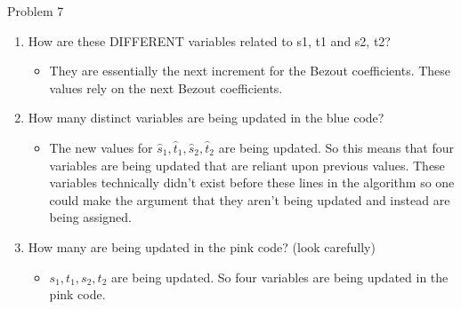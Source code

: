 \begin{problem}{Problem 7}
\begin{highlight}[Solution]
        \begin{enumerate}[start = 7]
            \item How are these DIFFERENT variables related to s1, t1 and s2, t2?
            \begin{itemize}
                \item They are essentially the next increment for the Bezout coefficients. These values rely on the next Bezout coefficients.
            \end{itemize}
            \item How many distinct variables are being updated in the blue code?
            \begin{itemize}
                \item The new values for $\hat{s}_{1},\hat{t}_{1},\hat{s}_{2},\hat{t}_{2}$ are being updated. So this means that four variables are being updated that are reliant upon previous values.
                These variables technically didn't exist before these lines in the algorithm so one could make the argument that they aren't being updated and instead are being assigned.
            \end{itemize}
            \item How many are being updated in the pink code? (look carefully)
            \begin{itemize}
                \item $s_{1},t_{1},s_{2},t_{2}$ are being updated. So four variables are being updated in the pink code.
            \end{itemize}
        \end{enumerate}
    \end{highlight}
\end{problem}


